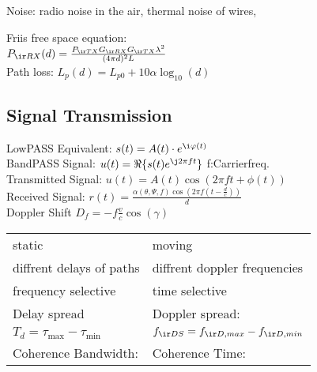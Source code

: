 \documentclass[fs, footer]{latex4ei}
\begin{document}
\begin{multicols*}{4}
	Noise: radio noise in the air, thermal noise of wires,


	Friis free space equation:\\
	$P_{\ir RX}(d) = \frac{P_{\ir TX} G_{\ir RX} G_{\ir TX} \lambda^2}{(4 \pi d)^2 L}$\\



	Path loss: $L_p(d) = L_{p0} + 10 \alpha \log_{10}(d)$
	
	\subsection{Signal Transmission}
	LowPASS Equivalent: $s(t) = A(t) \cdot e^{\i \varphi (t)}$\\
	BandPASS Signal: $u(t) = \Re\{s(t) e^{\j 2\pi f t} \}$ \qquad f:Carrierfreq.\\
	Transmitted Signal: $u(t) = A(t) \cos(2\pi ft + \phi(t))$\\
	Received Signal: $r(t) = \frac{\alpha(\theta,\Psi,f) \cos(2\pi f(t - \frac{d}{c}))}{d}$\\

	
	Doppler Shift $D_f = -f \frac{v}{c} \cos(\gamma)$\\


	\begin{tabular}{l|l}
		static & moving\\
		diffrent delays of paths & diffrent doppler frequencies\\
		frequency selective & time selective\\[0.5em]
		Delay spread & Doppler spread:\\
		$T_d = \tau_{\max} - \tau_{\min}$ & $f_{\ir DS} = f_{\ir D,max} - f_{\ir D,min}$\\[0.5em]
		Coherence Bandwidth: & Coherence Time:\\
		
	
	
	\end{tabular}



\end{multicols*}
\end{document}
